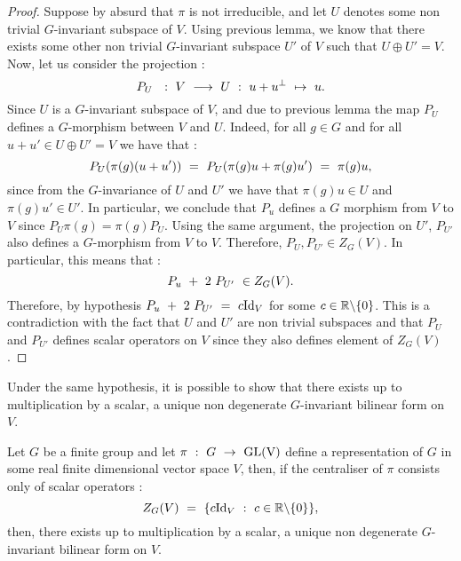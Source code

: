 \begin{proof}
	Suppose by absurd that $\pi$ is not irreducible, and let $U$ denotes some non trivial $G$-invariant subspace of $V$. Using previous lemma, we know that there exists some other non trivial $G$-invariant subspace $U'$ of $V$ such that $U\oplus U'=V$.
	Now, let us consider the projection :
	\begin{equation}
	P_U\text{ }\text{ }:\text{ } V\text{ }\longrightarrow\text{ } U\text{ } :\text{ } u+u^\perp\text{ } \mapsto\text{ } u.
	\end{equation}
	Since $U$ is a $G$-invariant subspace of $V$, and due to previous lemma the map $P_U$ defines a $G$-morphism between $V$ and $U$. Indeed, for all $g\in G$ and for all $u+u'\in U\oplus U'=V$ we have that :
	\begin{equation}
	P_U(\pi(g)(u+u'))\text{ }=\text{ } P_U(\pi(g)u+\pi(g)u')\text{ }=\text{ } \pi(g)u,
	\end{equation}
	since from the $G$-invariance of $U$ and $U'$ we have that $\pi(g)u\in U$ and $\pi(g)u'\in U'$. In particular, we conclude that $P_u$ defines a $G$ morphism from $V$ to $V$ since $P_U\pi(g)=\pi(g)P_U$. Using the same argument, the projection on $U'$,  $P_{U'}$ also defines a $G$-morphism from $V$ to $V$. Therefore, $P_U,P_{U'}\in Z_G(V)$. In particular, this means that :
	\begin{equation}
	P_u\text{ }+\text{ } 2\text{ } P_{U'}\text{ } \in Z_G(V).
	\end{equation}
	Therefore, by hypothesis $P_u\text{ }+\text{ } 2\text{ } P_{U'}\text{ }=\text{ } c\mbox{Id}_V$ for some $c\in \mathbb R\backslash\{0\}$. This is a contradiction with the fact that $U$ and $U'$ are non trivial subspaces and that $P_U$ and $P_{U'}$ defines scalar operators on $V$ since they also defines element of $Z_G(V)$.
\end{proof}
Under the same hypothesis, it is possible to show that there exists up to multiplication by a scalar, a unique non degenerate $G$-invariant bilinear form on $V$.
\begin{lemma}
		Let $G$ be a finite group and let $\pi \text{ }:\text{ } G\text{ }\rightarrow\text{ }\mbox{GL(V)}$ define a representation of $G$ in some real finite dimensional vector space $V$, then, if the centraliser of $\pi$ consists only of scalar operators :
		\begin{equation}
		Z_G(V)\text{ }=\text{ } \{c\mbox{Id}_V\text{ } :\text{ } c\in \mathbb R\backslash\{0\}\},
		\end{equation}
		then, there exists up to multiplication by a scalar, a unique non degenerate $G$-invariant bilinear form on $V$.
\end{lemma}
